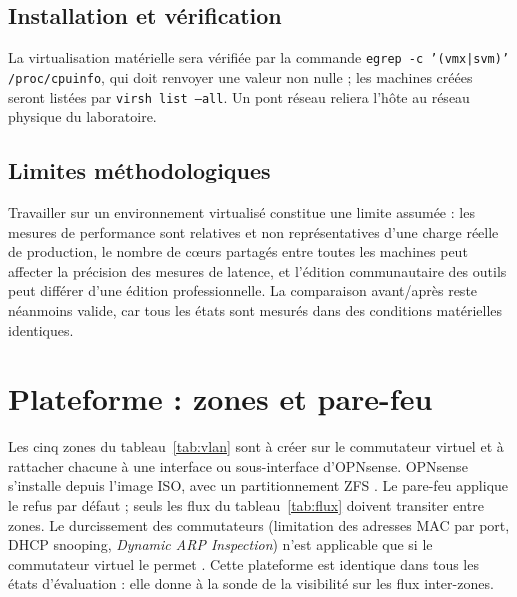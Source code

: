 \subsection{Installation et vérification}

La virtualisation matérielle sera vérifiée par la commande \texttt{egrep -c '(vmx|svm)' /proc/cpuinfo}, qui doit renvoyer une valeur non nulle ; les machines créées seront listées par \texttt{virsh list --all}. Un pont réseau reliera l'hôte au réseau physique du laboratoire.


\subsection{Limites méthodologiques}\label{sec:limites}

Travailler sur un environnement virtualisé constitue une limite assumée : les mesures de performance sont relatives et non représentatives d'une charge réelle de production, le nombre de cœurs partagés entre toutes les machines peut affecter la précision des mesures de latence, et l'édition communautaire des outils peut différer d'une édition professionnelle. La comparaison avant/après reste néanmoins valide, car tous les états sont mesurés dans des conditions matérielles identiques.

\section{Plateforme : zones et pare-feu}

Les cinq zones du tableau~\ref{tab:vlan} sont à créer sur le commutateur virtuel et à rattacher chacune à une interface ou sous-interface d'OPNsense. OPNsense  s'installe depuis l'image ISO, avec un partitionnement ZFS . Le pare-feu applique le refus par défaut ; seuls les flux du tableau~\ref{tab:flux} doivent transiter entre zones. Le durcissement des commutateurs (limitation des adresses MAC par port, DHCP snooping, \emph{Dynamic ARP Inspection}) n'est applicable que si le commutateur virtuel le permet . Cette plateforme est identique dans tous les états d'évaluation : elle donne à la sonde de la visibilité sur les flux inter-zones.


